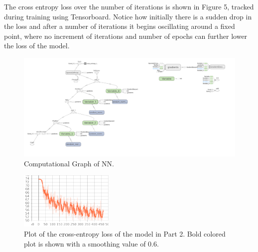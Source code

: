 \documentclass{article}
\begin{document}
    The cross entropy loss over the number of iterations is shown in Figure 5, tracked during training using Tensorboard. Notice how initially there is a sudden drop in the loss and after a number of iterations it begins oscillating around a fixed point, where no increment of iterations and number of epochs can further lower the loss of the model. \\
    
    \begin{figure}
    		\centering
    		\includegraphics[width=\textwidth]{images/png.png}
    		\caption{Computational Graph of NN.}
    	\end{figure}
    	
    	\begin{figure}
    		\centering
    		\includegraphics[width=0.4\textwidth]{images/cross_entropy_loss.pdf}
    		\caption{Plot of the cross-entropy loss of the model in Part 2. Bold colored plot is shown with a smoothing value of 0.6.}
    	\end{figure}
\end{document}
